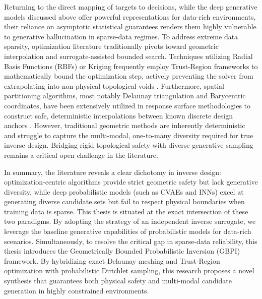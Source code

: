 Returning to the direct mapping of targets to decisions, while the deep generative models discussed above offer powerful representations for data-rich environments, their reliance on asymptotic statistical guarantees renders them highly vulnerable to generative hallucination in sparse-data regimes. To address extreme data sparsity, optimization literature traditionally pivots toward geometric interpolation and surrogate-assisted bounded search. Techniques utilizing Radial Basis Functions (RBFs) or Kriging frequently employ Trust-Region frameworks to mathematically bound the optimization step, actively preventing the solver from extrapolating into non-physical topological voids \cite{Conn2000TrustRegion, Regis2005Constrained}. Furthermore, spatial partitioning algorithms, most notably Delaunay triangulation and Barycentric coordinates, have been extensively utilized in response surface methodologies to construct safe, deterministic interpolations between known discrete design anchors \cite{Beliakov2006, Jones1998EGO}. However, traditional geometric methods are inherently deterministic and struggle to capture the multi-modal, one-to-many diversity required for true inverse design. Bridging rigid topological safety with diverse generative sampling remains a critical open challenge in the literature.

In summary, the literature reveals a clear dichotomy in inverse design: optimization-centric algorithms provide strict geometric safety but lack generative diversity, while deep probabilistic models (such as CVAEs and INNs) excel at generating diverse candidate sets but fail to respect physical boundaries when training data is sparse. This thesis is situated at the exact intersection of these two paradigms. By adopting the strategy of an independent inverse surrogate, we leverage the baseline generative capabilities of probabilistic models for data-rich scenarios. Simultaneously, to resolve the critical gap in sparse-data reliability, this thesis introduces the Geometrically Bounded Probabilistic Inversion (GBPI) framework. By hybridizing exact Delaunay meshing and Trust-Region optimization with probabilistic Dirichlet sampling, this research proposes a novel synthesis that guarantees both physical safety and multi-modal candidate generation in highly constrained environments.